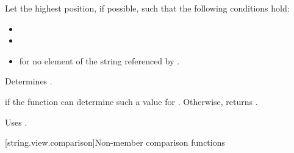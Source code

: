 \begin{itemdescr}
\pnum
Let  the highest position, if possible, such that the following conditions hold:
\begin{itemize}
\item
{}
\item
{}
\item
{} for no element  of the string referenced by .
\end{itemize}

\pnum
\effects
Determines .

\pnum
\returns
{} if the function can determine such a value for .
Otherwise, returns .

\pnum
\remarks
Uses .
\end{itemdescr}

[string.view.comparison]{Non-member comparison functions}

